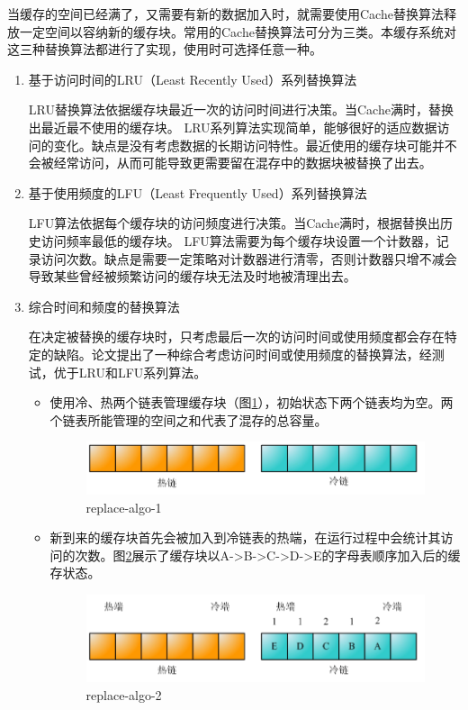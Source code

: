 当缓存的空间已经满了，又需要有新的数据加入时，就需要使用Cache替换算法释放一定空间以容纳新的缓存块。常用的Cache替换算法可分为三类。本缓存系统对这三种替换算法都进行了实现，使用时可选择任意一种。
\begin{enumerate}

\item 基于访问时间的LRU（Least Recently Used）系列替换算法

LRU替换算法依据缓存块最近一次的访问时间进行决策。当Cache满时，替换出最近最不使用的缓存块。
LRU系列算法实现简单，能够很好的适应数据访问的变化。缺点是没有考虑数据的长期访问特性。最近使用的缓存块可能并不会被经常访问，从而可能导致更需要留在混存中的数据块被替换了出去。

\item 基于使用频度的LFU（Least Frequently Used）系列替换算法

LFU算法依据每个缓存块的访问频度进行决策。当Cache满时，根据替换出历史访问频率最低的缓存块。
LFU算法需要为每个缓存块设置一个计数器，记录访问次数。缺点是需要一定策略对计数器进行清零，否则计数器只增不减会导致某些曾经被频繁访问的缓存块无法及时地被清理出去。

\item 综合时间和频度的替换算法

在决定被替换的缓存块时，只考虑最后一次的访问时间或使用频度都会存在特定的缺陷。论文提出了一种综合考虑访问时间或使用频度的替换算法，经测试，优于LRU和LFU系列算法。
\begin{itemize}
\item
使用冷、热两个链表管理缓存块（图\ref{fig:replace-algo-1}），初始状态下两个链表均为空。两个链表所能管理的空间之和代表了混存的总容量。
\begin{figure}
\centering
\includegraphics[width=0.6\linewidth]{./graph/replace-algo-1}
\caption{replace-algo-1}
\label{fig:replace-algo-1}
\end{figure}

\item
新到来的缓存块首先会被加入到冷链表的热端，在运行过程中会统计其访问的次数。图\ref{fig:replace-algo-2}展示了缓存块以A->B->C->D->E的字母表顺序加入后的缓存状态。
\begin{figure}
\centering
\includegraphics[width=0.6\linewidth]{./graph/replace-algo-2}
\caption{replace-algo-2}
\label{fig:replace-algo-2}
\end{figure}


\end{itemize}
\end{enumerate}
